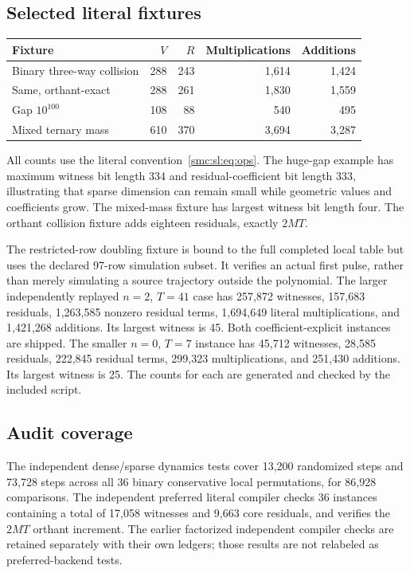 \documentclass[11pt,letterpaper]{article}
\numberwithin{equation}{section}
\theoremstyle{definition}
\theoremstyle{remark}
\begin{document}
\subsection{Selected literal fixtures}
\begin{center}
\begin{tabular}{@{}lrrrr@{}}
\toprule
Fixture & $V$ & $R$ & Multiplications & Additions\\\midrule
Binary three-way collision & 288 & 243 & 1,614 & 1,424\\
Same, orthant-exact & 288 & 261 & 1,830 & 1,559\\
Gap $10^{100}$ & 108 & 88 & 540 & 495\\
Mixed ternary mass & 610 & 370 & 3,694 & 3,287\\\bottomrule
\end{tabular}
\end{center}
All counts use the literal convention~\eqref{smc:sl:eq:ops}. The huge-gap example has maximum witness bit length 334 and residual-coefficient bit length 333, illustrating that sparse dimension can remain small while geometric values and coefficients grow. The mixed-mass fixture has largest witness bit length four. The orthant collision fixture adds eighteen residuals, exactly $2MT$.

The restricted-row doubling fixture is bound to the full completed local table but uses the declared 97-row simulation subset. It verifies an actual first pulse, rather than merely simulating a source trajectory outside the polynomial. The larger independently replayed $n=2$, $T=41$ case has 257,872 witnesses, 157,683 residuals, 1,263,585 nonzero residual terms, 1,694,649 literal multiplications, and 1,421,268 additions. Its largest witness is 45. Both coefficient-explicit instances are shipped. The smaller $n=0$, $T=7$ instance has 45,712 witnesses, 28,585 residuals, 222,845 residual terms, 299,323 multiplications, and 251,430 additions. Its largest witness is 25. The counts for each are generated and checked by the included script.

\subsection{Audit coverage}
The independent dense/sparse dynamics tests cover 13,200 randomized steps and 73,728 steps across all 36 binary conservative local permutations, for 86,928 comparisons. The independent preferred literal compiler checks 36 instances containing a total of 17,058 witnesses and 9,663 core residuals, and verifies the $2MT$ orthant increment. The earlier factorized independent compiler checks are retained separately with their own ledgers; those results are not relabeled as preferred-backend tests.
\end{document}
